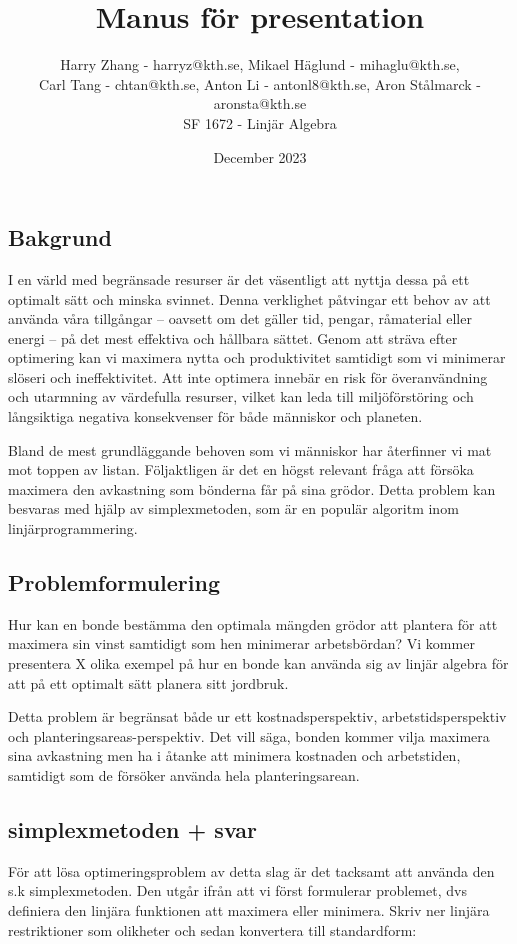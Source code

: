 \documentclass{article}
\title{Manus för presentation}
\author{
    Harry Zhang - harryz@kth.se, Mikael Häglund - mihaglu@kth.se, \\
    Carl Tang - chtan@kth.se, Anton Li - antonl8@kth.se, Aron Stålmarck - aronsta@kth.se \\
    SF 1672 - Linjär Algebra
}
\date{December 2023}
\begin{document}
\maketitle
\subsection{Bakgrund}
I en värld med begränsade resurser är det väsentligt att nyttja dessa på ett optimalt sätt och minska svinnet. Denna verklighet påtvingar ett behov av att använda våra tillgångar – oavsett om det gäller tid, pengar, råmaterial eller energi – på det mest effektiva och hållbara sättet. Genom att sträva efter optimering kan vi maximera nytta och produktivitet samtidigt som vi minimerar slöseri och ineffektivitet. Att inte optimera innebär en risk för överanvändning och utarmning av värdefulla resurser, vilket kan leda till miljöförstöring och långsiktiga negativa konsekvenser för både människor och planeten.

Bland de mest grundläggande behoven som vi människor har återfinner vi mat mot toppen av listan. Följaktligen är det en högst relevant fråga att försöka maximera den avkastning som bönderna får på sina grödor. Detta problem kan besvaras med hjälp av simplexmetoden, som är en populär algoritm inom linjärprogrammering.

\subsection{Problemformulering}
Hur kan en bonde bestämma den optimala mängden grödor att plantera för att maximera sin vinst samtidigt som hen minimerar arbetsbördan? Vi kommer presentera X olika exempel på hur en bonde kan använda sig av linjär algebra för att på ett optimalt sätt planera sitt jordbruk. 

Detta problem är begränsat både ur ett kostnadsperspektiv, arbetstidsperspektiv och planteringsareas-perspektiv. Det vill säga, bonden kommer vilja maximera sina avkastning men ha i åtanke att minimera kostnaden och arbetstiden, samtidigt som de försöker använda hela planteringsarean.  %

\subsection{simplexmetoden + svar}
För att lösa optimeringsproblem av detta slag är det tacksamt att använda den s.k simplexmetoden. Den utgår ifrån att vi först formulerar problemet, dvs definiera den linjära funktionen att maximera eller minimera. Skriv ner linjära restriktioner som olikheter och sedan konvertera till standardform:
\end{document}
